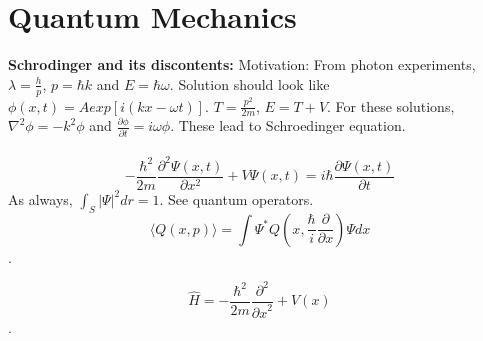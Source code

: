 \section{Quantum Mechanics}
{\bf Schrodinger and its discontents:}
Motivation:  From photon experiments, $\lambda = {\frac {h} {p}}$, $p= \hbar k$ and $E= \hbar \omega$.
Solution should look like $\phi(x,t) = A exp[i(kx- \omega t)]$. $T= {\frac{p^2} {2m}}$, $E= T+V$.  For these
solutions, $\nabla^2 \phi = -k^2 \phi$ and ${\frac {\partial \phi} {\partial t}} = i \omega \phi$.  These lead to
Schroedinger equation.
\\
\\
$$-{\frac {\hbar^2} {2m}} {\frac {\partial^2 \Psi (x, t)} {\partial x^2}} +
V \Psi(x,t)= i \hbar {\frac {\partial \Psi(x,t)} {\partial t}}$$
As always, $\int_S |\Psi|^2 dr = 1$.  See quantum operators.
\\

$$\langle Q(x,p)\rangle= 
\int \Psi^* Q(x,{\frac {\hbar} {i}}{\frac {\partial}{\partial x}}) \Psi dx$$.

$$\hat{H}= -{\frac {\hbar^2} {2m}} {\frac {\partial^2} {{\partial x}^2}} + V(x)$$.

